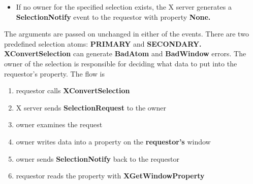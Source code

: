 \documentclass{report}
\begin{document}
\begin{itemize}
\begin{itemize}
            \item If no owner for the specified selection exists, the X server generates a \textbf{SelectionNotify} event to the requestor with property \textbf{None.}
        \end{itemize}
        The arguments are passed on unchanged in either of the events. There are two predefined selection atoms: \textbf{PRIMARY} and \textbf{SECONDARY.}
        \bigbreak \noindent 
        \textbf{XConvertSelection} can generate \textbf{BadAtom} and \textbf{BadWindow} errors.
        \bigbreak \noindent 
        The owner of the selection is responsible for deciding what data to put into the requestor’s property. The flow is
        \begin{enumerate}
            \item requestor calls \textbf{XConvertSelection}
            \item X server sends \textbf{SelectionRequest} to the owner
            \item owner examines the request
            \item owner writes data into a property on the \textbf{requestor's} window
            \item owner sends \textbf{SelectionNotify} back to the requestor
            \item requestor reads the property with \textbf{XGetWindowProperty}
        \end{enumerate}






        



    \end{itemize}
\end{document}

